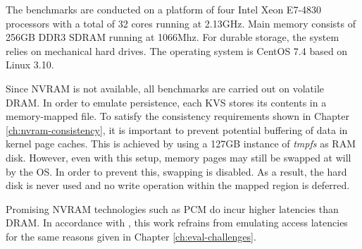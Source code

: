 The benchmarks are conducted on a platform of four Intel Xeon E7-4830 processors
with a total of 32 cores running at 2.13GHz. Main memory consists of 256GB DDR3
SDRAM running at 1066Mhz. For durable storage, the system relies on mechanical
hard drives. The operating system is CentOS 7.4 based on Linux 3.10.

Since NVRAM is not available, all benchmarks are carried out on volatile DRAM.
In order to emulate persistence, each KVS stores its contents in a memory-mapped
file. To satisfy the consistency requirements shown in Chapter
\ref{ch:nvram-consistency}, it is important to prevent potential buffering of
data in kernel page caches. This is achieved by using a 127GB instance of
\emph{tmpfs} as RAM disk. However, even with this setup, memory pages may still
be swapped at will by the OS. In order to prevent this, swapping is disabled. As
a result, the hard disk is never used and no write operation within the mapped
region is deferred.

Promising NVRAM technologies such as PCM do incur higher latencies than DRAM. In
accordance with \cite{bailey2013exploring, zhou2016nvht}, this work refrains
from emulating access latencies for the same reasons given in Chapter
\ref{ch:eval-challenges}.

